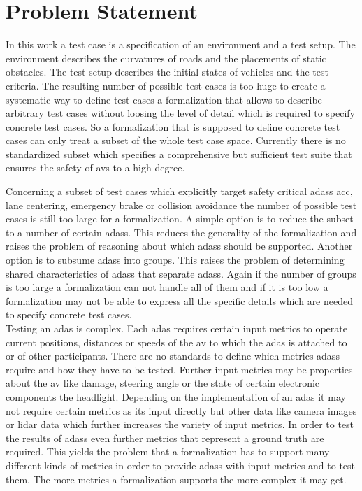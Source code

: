 \section{Problem Statement}\label{sec:problemStatement}
In this work a test case is a specification of an environment and a test setup.
The environment describes the curvatures of roads and the placements of static obstacles.
The test setup describes the initial states of vehicles and the test criteria.
The resulting number of possible test cases is too huge to create a systematic way to define test cases \ie{} a formalization that allows to describe arbitrary test cases without loosing the level of detail which is required to specify concrete test cases.
So a formalization that is supposed to define concrete test cases can only treat a subset of the whole test case space.
Currently there is no standardized subset which specifies a comprehensive but sufficient test suite that ensures the safety of \glspl{av} to a high degree.\par

Concerning a subset of test cases which explicitly target safety critical \glspl{adas} \eg{} \gls{acc}, lane centering, emergency brake or collision avoidance the number of possible test cases is still too large for a formalization.
A simple option is to reduce the subset to a number of certain \glspl{adas}.
This reduces the generality of the formalization and raises the problem of reasoning about which \glspl{adas} should be supported.
Another option is to subsume \glspl{adas} into groups.
This raises the problem of determining shared characteristics of \glspl{adas} that separate \glspl{adas}.
Again if the number of groups is too large a formalization can not handle all of them and if it is too low a formalization may not be able to express all the specific details which are needed to specify concrete test cases.\\
Testing an \gls{adas} is complex.
Each \gls{adas} requires certain input metrics to operate \eg{} current positions, distances or speeds of the \gls{av} to which the \gls{adas} is attached to or of other participants.
There are no standards to define which metrics \glspl{adas} require and how they have to be tested.
Further input metrics may be properties about the \gls{av} like damage, steering angle or the state of certain electronic components \eg{} the headlight.
Depending on the implementation of an \gls{adas} it may not require certain metrics as its input directly but other data like camera images or \gls{lidar} data which further increases the variety of input metrics.
In order to test the results of \glspl{adas} even further metrics that \eg{} represent a ground truth are required.
This yields the problem that a formalization has to support many different kinds of metrics in order to provide \glspl{adas} with input metrics and to test them.
The more metrics a formalization supports the more complex it may get.\par

